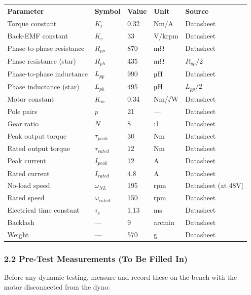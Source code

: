 \documentclass[
]{article}
\newcounter{none} %
\begin{document}
{\def\LTcaptype{none} %
\begin{longtable}[]{@{}lllll@{}}
\toprule\noalign{}
Parameter & Symbol & Value & Unit & Source \\
\midrule\noalign{}
\endhead
\bottomrule\noalign{}
\endlastfoot
Torque constant & \(K_t\) & 0.32 & Nm/A & Datasheet \\
Back-EMF constant & \(K_e\) & 33 & V/krpm & Datasheet \\
Phase-to-phase resistance & \(R_{pp}\) & 870 & mΩ & Datasheet \\
Phase resistance (star) & \(R_{ph}\) & 435 & mΩ & \(R_{pp}/2\) \\
Phase-to-phase inductance & \(L_{pp}\) & 990 & µH & Datasheet \\
Phase inductance (star) & \(L_{ph}\) & 495 & µH & \(L_{pp}/2\) \\
Motor constant & \(K_m\) & 0.34 & Nm/√W & Datasheet \\
Pole pairs & \(p\) & 21 & --- & Datasheet \\
Gear ratio & \(N\) & 8 & :1 & Datasheet \\
Peak output torque & \(\tau_{peak}\) & 30 & Nm & Datasheet \\
Rated output torque & \(\tau_{rated}\) & 12 & Nm & Datasheet \\
Peak current & \(I_{peak}\) & 12 & A & Datasheet \\
Rated current & \(I_{rated}\) & 4.8 & A & Datasheet \\
No-load speed & \(\omega_{NL}\) & 195 & rpm & Datasheet (at 48V) \\
Rated speed & \(\omega_{rated}\) & 150 & rpm & Datasheet \\
Electrical time constant & \(\tau_e\) & 1.13 & ms & Datasheet \\
Backlash & --- & 9 & arcmin & Datasheet \\
Weight & --- & 570 & g & Datasheet \\
\end{longtable}
}

\subsubsection{2.2 Pre-Test Measurements (To Be Filled
In)}\label{pre-test-measurements-to-be-filled-in}

Before any dynamic testing, measure and record these on the bench with
the motor disconnected from the dyno:
\end{document}
